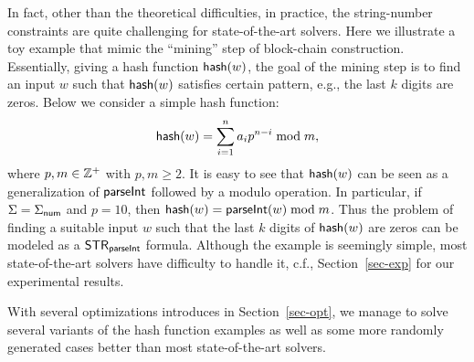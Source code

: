 In fact, other than the theoretical difficulties, in practice, the string-number constraints are quite challenging for state-of-the-art solvers. 
Here we illustrate a toy example that mimic the ``mining'' step of block-chain construction. Essentially, giving a hash function ${\sf hash}(w)$, the goal of the mining step is to find an input $w$ such that ${\sf hash}(w)$ satisfies certain pattern, e.g., the last $k$ digits are zeros. Below we consider a simple hash function:
$${\sf hash}(w) = \sum \limits_{i = 1}^n a_i p^{n-i} \bmod m,$$ 
where $p, m \in \mathbb{Z}^+$ with $p, m \ge 2$. It is easy to see that ${\sf hash}(w)$ can be seen as a generalization of $\textsf{parseInt}$ followed by a modulo operation. In particular, if $\Sigma = \Sigma_{\sf num}$ and $p = 10$, then ${\sf hash}(w) = \textsf{parseInt}(w) \bmod m$. Thus the problem of finding a suitable input $w$ such that the last $k$ digits of ${\sf hash}(w)$ are zeros can be modeled as a ${\sf STR}_{\textsf{parseInt}}$ formula. Although the example is seemingly simple, most state-of-the-art solvers have difficulty to handle it, c.f., Section~\ref{sec-exp} for our experimental results. 

With several optimizations introduces in Section~\ref{sec-opt}, we manage to solve several variants of the hash function examples as well as some more randomly generated cases better than most state-of-the-art solvers. 
 


